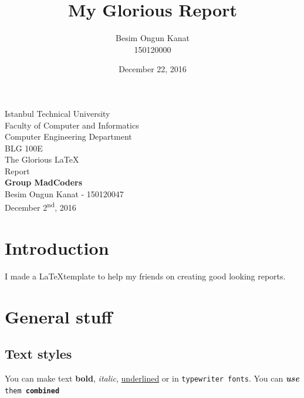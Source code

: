 \documentclass[a4paper, 12pt, titlepage]{article}
\title{My Glorious Report}
\author{Besim Ongun Kanat \\ 150120000}
\date{December 22, 2016}
\begin{document}

\begin{titlepage}
	\begin{center}
		\large{Istanbul Technical University \\ Faculty of Computer and Informatics \\ Computer Engineering Department} \\
		\vspace{150pt}
		\Large{BLG 100E \\ The Glorious \LaTeX \\ Report}  \\
		\vspace{30pt}
		\Large{\textbf{Group MadCoders}} \\
		\large{Besim Ongun Kanat - 150120047} \\
		\vspace{\fill} %
		\large{December 2\textsuperscript{nd}, 2016}
	\end{center}
\end{titlepage}
\newpage
\tableofcontents
\newpage

\section{Introduction}
I made a \LaTeX template to help my friends on creating good looking reports.

\section{General stuff}
\subsection{Text styles}
You can make text \textbf{bold}, \textit{italic}, \underline{underlined} or in \texttt{typewriter fonts}. You can \textit{\textbf{use}} \texttt{them \textbf{combined}}
\end{document}
